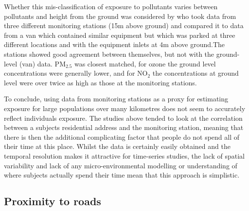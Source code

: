 Whether this mis-classification of exposure to pollutants varies between pollutants and height from the ground was considered by \cite{Restrepo2004} who took data from three different monitoring stations (15m above ground) and compared it to data from a van which contained similar equipment but which was parked at three different locations and with the equipment inlets at 4m above ground.The stations showed good agreement between themselves, but not with the ground-level (van) data. PM$_{2.5}$ was closest matched, for ozone the ground level concentrations were generally lower, and for NO$_{2}$ the concentrations at ground level were over twice as high as those at the monitoring stations.

To conclude, using data from monitoring stations as a proxy for estimating exposure for large populations over many kilometres does not seem to accurately reflect individuals exposure. The studies above tended to look at the correlation between a subjects residential address and the monitoring station, meaning that there is then the additional complicating factor that people do not spend all of their time at this place. Whilst the data is certainly easily obtained and the temporal resolution makes it attractive for time-series studies, the lack of spatial variability and lack of any micro-environmental modelling or understanding of where subjects actually spend their time mean that this approach is simplistic. 



\subsection{Proximity to roads}
\label{subsec:proximitytoroads}

